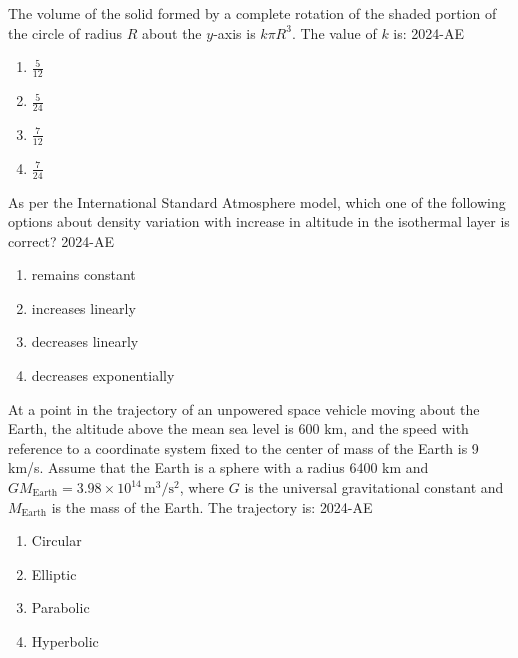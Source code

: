     \item The volume of the solid formed by a complete rotation of the shaded portion of the circle of radius $R$ about the $y$-axis is $k \pi R^3$. The value of $k$ is:
     \hfill{2024-AE}
    \begin{enumerate}
        \item $\frac{5}{12}$
        \item $\frac{5}{24}$
        \item $\frac{7}{12}$
        \item $\frac{7}{24}$
    \end{enumerate}
     \item As per the International Standard Atmosphere model, which one of the following options about density variation with increase in altitude in the isothermal layer is correct?
      \hfill{2024-AE}
    \begin{enumerate}
        \item remains constant
        \item increases linearly
        \item decreases linearly
        \item decreases exponentially
    \end{enumerate}

\item At a point in the trajectory of an unpowered space vehicle moving about the Earth, the altitude above the mean sea level is 600 km, and the speed with reference to a coordinate system fixed to the center of mass of the Earth is 9 km/s. Assume that the Earth is a sphere with a radius 6400 km and $GM_{\text{Earth}} = 3.98 \times 10^{14} \, \text{m}^3/\text{s}^2$, where $G$ is the universal gravitational constant and $M_{\text{Earth}}$ is the mass of the Earth. The trajectory is:
 \hfill{2024-AE}
    \begin{enumerate}
        \item Circular
        \item Elliptic
        \item Parabolic
        \item Hyperbolic
    \end{enumerate}
